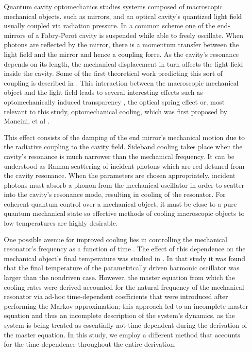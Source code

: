 \documentclass[reprint, amsmath,amssymb, aps,pra]{revtex4-1}
\begin{document}
Quantum cavity optomechanics studies systems composed of macroscopic
mechanical objects, such as mirrors, and an optical cavity's quantized
light field usually coupled via radiation pressure. In a common scheme one of the end-mirrors of a Fabry-Perot cavity is suspended while able to
freely oscillate. When photons are reflected by the mirror, there is a
momentum transfer between the light field and the mirror and hence a
coupling force. As the cavity's resonance depends on its length, the
mechanical displacement in turn affects the light field inside the cavity.
Some of the first theoretical work predicting this sort of coupling is
described in \cite{BraginskiiOG}. This interaction between the
macroscopic mechanical object and the light field leads to several
interesting effects such as optomechanically induced transparency
\cite{WeissOIT}, the optical spring effect \cite{VogelOT} or, most
relevant to this study, optomechanical cooling, which was first proposed by Mancini, et al \cite{CohadonCM,
  CorbittOC, SchliesserRPC, LCNooshi, ManciniOC}.
	
This effect consists of the damping of the end mirror's mechanical
motion due to the radiative coupling to the cavity field. Sideband
cooling takes place when the cavity's resonance is much narrower than
the mechanical frequency. It can be understood as Raman scattering
of incident photons \cite{MarquardtQTOQ} which are red-detuned from the cavity
resonance. When the parameters are chosen appropriately, incident photons must absorb a phonon from the mechanical oscillator in order to scatter into the
cavity's resonance mode, resulting in cooling of the resonator. For coherent quantum
control over a mechanical object, it must be close to a pure quantum
mechanical state \cite{KippenberCO} so effective methods of cooling
macroscopic objects to low temperatures are highly desirable.

One possible avenue for improved cooling lies in controlling the
mechanical resonator's frequency as a function of time
\cite{JockelMR}. The effect of this dependence on the mechanical
object's final temperature was studied in \cite{BarberisLC}. In that
study it was found that the final temperature of the parametrically
driven harmonic oscillator was larger than the nondriven case. However, the
master equation from which the cooling rates were derived accounted
for the natural frequency of the mechanical resonator via ad-hoc
time-dependent coefficients that were introduced after performing the
Markov approximation; this approach led to an incomplete master
equation and thus an incomplete description of the system's dynamics,
as the system is being treated as essentially not time-dependent
during the derivation of the master equation. In this study, we employ
a different method that accounts for the time dependence throughout
the entire derivation.
\end{document}
